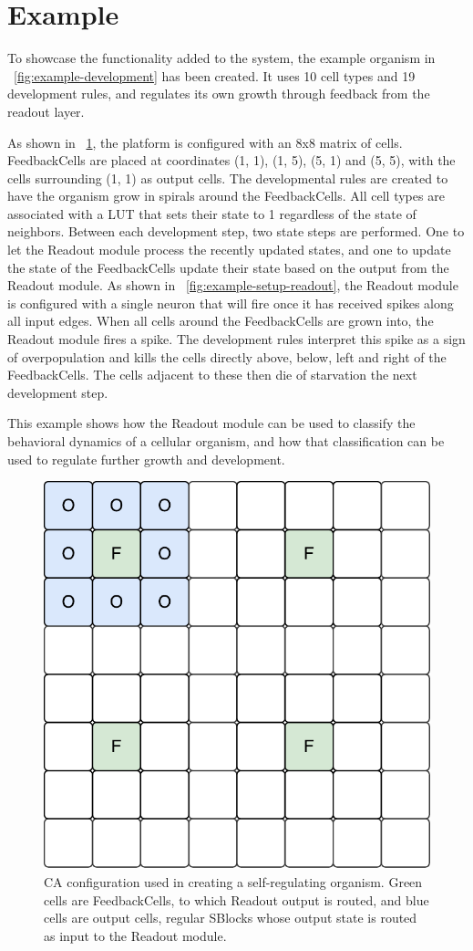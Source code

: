 \section{Example}
\label{sec:selfreg-example}

To showcase the functionality added to the system, the example organism in
\figurename~\ref{fig:example-development} has been created. It uses 10 cell
types and 19 development rules, and regulates its own growth through feedback
from the readout layer.

As shown in \figurename~\ref{fig:example-setup-ca}, the platform is configured
with an 8x8 matrix of cells. FeedbackCells are placed at coordinates (1, 1), (1,
5), (5, 1) and (5, 5), with the cells surrounding (1, 1) as output cells. The
developmental rules are created to have the organism grow in spirals around the
FeedbackCells. All cell types are associated with a LUT that sets their state to
1 regardless of the state of neighbors. Between each development step, two state
steps are performed. One to let the Readout module process the recently updated
states, and one to update the state of the FeedbackCells update their state
based on the output from the Readout module. As shown in
\figurename~\ref{fig:example-setup-readout}, the Readout module is configured
with a single neuron that will fire once it has received spikes along all input
edges. When all cells around the FeedbackCells are grown into, the Readout
module fires a spike. The development rules interpret this spike as a sign of
overpopulation and kills the cells directly above, below, left and right of the
FeedbackCells. The cells adjacent to these then die of starvation the next
development step.

This example shows how the Readout module can be used to classify the behavioral
dynamics of a cellular organism, and how that classification can be used to
regulate further growth and development.

\begin{figure}[ht]
  \centering
  \includegraphics[width=0.4\linewidth]{fig/example-setup}
  \caption[Example CA configuration]{
    CA configuration used in creating a self-regulating organism. Green cells
    are FeedbackCells, to which Readout output is routed, and blue cells are output
    cells, regular SBlocks whose output state is routed as input to the Readout
    module.
  }
  \label{fig:example-setup-ca}
\end{figure}

